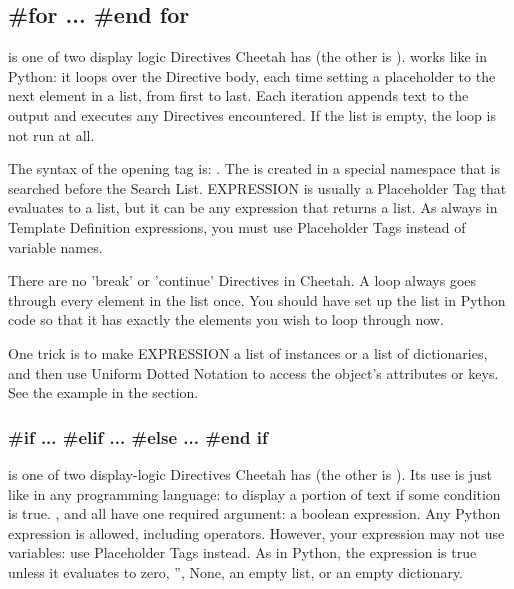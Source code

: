 {%
\subsection{\#for ... \#end for}

 is one of two display logic Directives Cheetah has (the other is
).   works like in Python: it loops over the Directive
body, each time setting a placeholder to the next element in a list, from first
to last.  Each iteration appends text to the output and executes any
Directives encountered.  If the list is empty, the loop is not run at all.

The syntax of the opening tag is: .  The  is created in a special namespace
that is searched before the Search List.  EXPRESSION is usually a 
Placeholder Tag that evaluates to a list, but it can be any expression that
returns a list.  As always in Template Definition expressions, you must use
Placeholder Tags instead of variable names.

There are no 'break' or 'continue' Directives in Cheetah.  A  loop
always goes through every element in the list once.  You should have set up the
list in Python code so that it has exactly the elements you wish to loop through
now.

One trick is to make EXPRESSION a list of instances or a list of dictionaries,
and then use Uniform Dotted Notation to access the object's attributes or keys.
See the example in the  section.

\subsubsection{\#if ... \#elif ... \#else ... \#end if}

 is one of two display-logic Directives Cheetah has (the other is
).  Its use is just like in any programming language: to display
a portion of text if some condition is true.  
,  and  all have one required argument:
a boolean expression.  Any Python expression is allowed, including operators.
However, your expression may not use variables:  use Placeholder Tags instead.
As in Python, the expression is true unless it evaluates to zero, '', None, an
empty list, or an empty dictionary.

}
